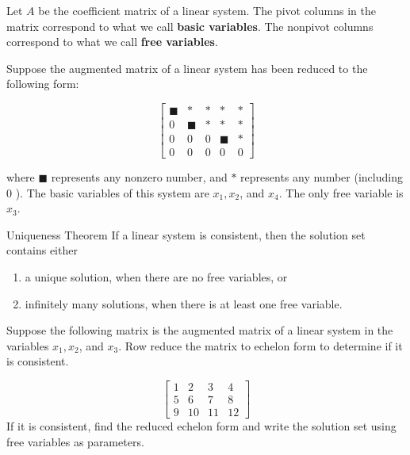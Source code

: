 Let $A$ be the coefficient matrix of a linear system. The pivot columns in the matrix correspond to what we call \textbf{basic variables}. The nonpivot columns correspond to what we call \textbf{free variables}.

\begin{example} Suppose the augmented matrix of a linear system has been reduced to the following form:

\[
\left[\begin{array}{lllll}
\blacksquare & * & * & * & * \\
0 & \blacksquare & * & * & * \\
0 & 0 & 0 & \blacksquare & * \\
0 & 0 & 0 & 0 & 0
\end{array}\right]
\]

where $\blacksquare$ represents any nonzero number, and $*$ represents any number (including 0 ). The basic variables of this system are $x_1, x_2$, and $x_4$. The only free variable is $x_3$.

\end{example}


\begin{theorem}{Uniqueness Theorem}
    If a linear system is consistent, then the solution set contains either
    \begin{enumerate}[label=(\roman*)]
        \item a unique solution, when there are no free variables, or
        \item infinitely many solutions, when there is at least one free variable.
    \end{enumerate}
\end{theorem}

\begin{example} Suppose the following matrix is the augmented matrix of a linear system in the variables $x_1, x_2$, and $x_3$. Row reduce the matrix to echelon form to determine if it is consistent.

\[
\left[\begin{array}{cccc}
1 & 2 & 3 & 4 \\
5 & 6 & 7 & 8 \\
9 & 10 & 11 & 12
\end{array}\right]
\]
If it is consistent, find the reduced echelon form and write the solution set using free variables as parameters.
\end{example}

